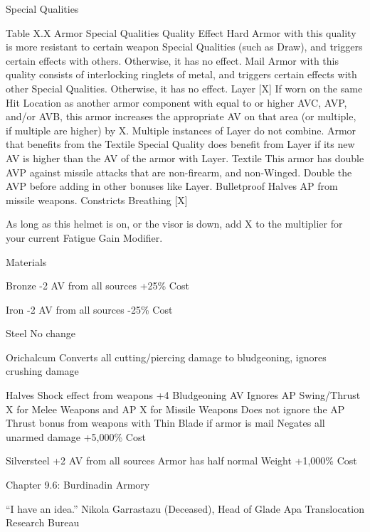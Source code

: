 \documentclass[oneside,11pt,english]{book}
\begin{document}
 

Special Qualities 

 

Table X.X Armor Special Qualities 
Quality Effect 
Hard Armor with this quality is more resistant to certain weapon Special Qualities (such as Draw), and 
triggers certain effects with others. Otherwise, it has no effect. 
Mail Armor with this quality consists of interlocking ringlets of metal, and triggers certain effects with 
other Special Qualities. Otherwise, it has no effect. 
Layer [X] If worn on the same Hit Location as another armor component with equal to or higher AVC, AVP, 
and/or AVB, this armor increases the appropriate AV on that area (or multiple, if multiple are 
higher) by X. Multiple instances of Layer do not combine. Armor that benefits from the Textile 
Special Quality does benefit from Layer if its new AV is higher than the AV of the armor with 
Layer. 
Textile This armor has double AVP against missile attacks that are non-firearm, and non-Winged. Double 
the AVP before adding in other bonuses like Layer. 
Bulletproof Halves AP from missile weapons. 
Constricts 
Breathing [X] 

As long as this helmet is on, or the visor is down, add X to the multiplier for your current Fatigue 
Gain Modifier. 

 

Materials 

 

Bronze 
-2 AV from all sources 
+25\% Cost 

 

Iron 
-2 AV from all sources 
-25\% Cost 

 

Steel 
No change 

 

Orichalcum 
Converts all cutting/piercing damage to bludgeoning, ignores crushing damage 


Halves Shock effect from weapons 
+4 Bludgeoning AV 
Ignores AP Swing/Thrust X for Melee Weapons and AP X for Missile Weapons 
Does not ignore the AP Thrust bonus from weapons with Thin Blade if armor is mail 
Negates all unarmed damage 
+5,000\% Cost 

 

Silversteel 
+2 AV from all sources 
Armor has half normal Weight 
+1,000\% Cost 
 
Chapter 9.6: Burdinadin Armory 

 

“I have an idea.” 
Nikola Garrastazu (Deceased), Head of Glade Apa Translocation Research Bureau 
\end{document}

